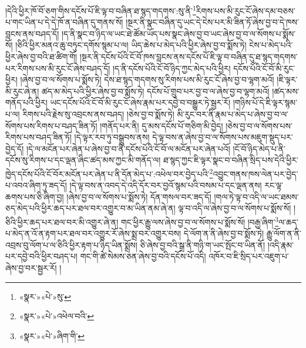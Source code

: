 །དེའི་ཕྱིར་ཁོ་བོ་ཅག་གིས་དངོས་པོ་ཇི་ལྟ་བ་བཞིན་ཐ་སྙད་གདགས་:སུ་ནི་\footnote{«སྣར་»«པེ་»སུ་}རིགས་པས་མི་རུང་ངོ་ཞེས་དམ་བཅས་པ་གང་ཡིན་པ་དེ་དེ་ཁོ་ན་བཞིན་དུ་གནས་སོ། །སྔར་ནི་སྣང་བཞིན་དུ་ཡང་དེ་ངེས་པར་མི་ཟིན་ཏོ་ཞེས་བྱ་བ་དེ་ཁས་བླངས་ནས་བཤད་དོ། །ད་ནི་སྣང་བ་ཉིད་ལ་ཡང་ཐེ་ཚོམ་ཡོད་པས་སྣང་ཞེས་བྱ་བ་ཡང་ཞེས་བྱ་བ་ལ་སོགས་པ་སྨོས་སོ། །ཅིའི་ཕྱིར་མནའ་ཆུ་བཏུང་དགོས་སྙམ་པ་ལ། ཡིད་ཆེས་པ་མེད་པའི་ཕྱིར་ཞེས་བྱ་བ་སྨོས་ཏེ། ངེས་པ་མེད་པའི་ཕྱིར་ཞེས་བྱ་བའི་ཐ་ཚིག་གོ། །སྔར་ནི་དངོས་པོའི་ངོ་བོ་ཁས་བླངས་ནས་དངོས་པོ་ཇི་ལྟ་བ་བཞིན་དུ་ཐ་སྙད་གདགས་པར་རིགས་པས་མི་རུང་ངོ་ཞེས་བཤད་དོ། །ད་ནི་དངོས་པོའི་ངོ་བོ་ཉིད་ཀྱང་མེད་པའི་ཕྱིར། དངོས་པོའི་ངོ་བོ་མི་རུང་ཕྱིར། །ཞེས་བྱ་བ་ལ་སོགས་པ་སྨོས་ཏེ། དེས་ཐ་སྙད་གདགས་སུ་རིགས་པས་མི་རུང་ངོ་ཞེས་བྱ་བ་ལྷག་མའོ། །ཇི་ལྟར་མི་རུང་ཞེ་ན། ཚད་མ་མེད་པའི་ཕྱིར་ཞེས་བྱ་བ་སྨོས་ཏེ། དངོས་པོ་གྲུབ་པར་བྱ་བ་ལ་ཞེས་བྱ་བ་ལྷག་མའོ། །ཚད་མས་གནོད་པའི་ཕྱིར། ཡང་དངོས་པོའི་ངོ་བོ་མི་རུང་ངོ་ཞེས་རྣམ་པར་དབྱེ་བ་བསྒྱུར་ཏེ་སྦྱར་རོ། །གཉིས་པོ་དེ་ཇི་ལྟར་སྙམ་པ་ལ། རིགས་པའི་རྗེས་སུ་འབྲངས་ནས་བཤད། །ཅེས་བྱ་བ་སྨོས་ཏེ། མི་རུང་བར་ནི་རྣམ་པ་མེད་པ་ཞེས་བྱ་བ་ལ་སོགས་པས་རིགས་པ་བཤད་ཟིན་ཏོ། །གནོད་པར་ནི། དུ་མས་དངོས་པོ་གཅིག་མི་བྱེད། །ཅེས་བྱ་བ་ལ་སོགས་པས་རིགས་པས་བཤད་ཟིན་ཏོ། །དེ་ལྟར་རབ་ཏུ་བསྒྲུབས་ནས། དེ་ལྟ་བས་ན་ཞེས་བྱ་བ་ལ་སོགས་པས་མཇུག་སྡུད་པར་བྱེད་དོ། །དེ་ལ་མངོན་པར་ཞེན་པ་ཞེས་བྱ་བ་ནི་དངོས་པོའི་ངོ་བོ་ལ་མངོན་པར་ཞེན་པའོ། །ངོ་བོ་ཉིད་མེད་པ་ནི་དངོས་སུ་རིགས་པ་དང་ལྡན་ཞིང་ཚད་མས་ཀྱང་མི་གནོད་ལ། ཐ་སྙད་ཀྱང་ཇི་ལྟར་སྣང་བ་བཞིན་སྲིད་པས་དེའི་ཕྱིར་ཁྱེད་དངོས་པོའི་ངོ་བོར་མངོན་པར་ཞེན་པ་ནི་དོན་མེད་པ་:འཕེལ་བར་བྱེད་པའི་\footnote{«སྣར་»«པེ་»འཕེལ་བའི་}འབྱུང་གནས་ཁས་ལེན་པར་བྱེད་པ་འབའ་ཞིག་ཏུ་ཟད་དོ། །དེ་ལྟ་བས་ན་འབད་དེ་འདི་དོར་བར་བྱའོ་སྙམ་པའི་བསམ་པ་དང་ལྡན་ནས། རང་ལྟ་ཆགས་པས་ཅི་ཞིག་བྱ། །ཞེས་བྱ་བ་ལ་སོགས་པ་སྨོས་ཏེ། དོན་གསལ་བར་ཟད་དོ། །གལ་ཏེ་ལྟ་བ་འདི་ལ་ཡང་ཐམས་ཅད་མེད་པའི་ཕྱིར་ཆད་པར་ཐལ་བར་འགྱུར་བ་མ་ཡིན་ནམ་ཞེ་ན། ལྟ་བ་འདི་ལ་ཞེས་བྱ་བ་ལ་སོགས་པ་སྨོས་སོ། །ཅིའི་ཕྱིར་ཆད་པར་ཐལ་བར་མི་འགྱུར་ཞེ་ན། གང་ཕྱིར་རྒྱུ་ལས་ཞེས་བྱ་བ་ལ་སོགས་པ་སྨོས་སོ། །བརྒྱ་ཞིག་\footnote{«སྣར་»«པེ་»ཞིག་གི་}ལ་ཆད་པ་མེད་ན་འོ་ན་རྟག་པར་ཐལ་བར་འགྱུར་རོ་ཞེས་སྨྲ་བར་འགྱུར་བས། དེ་ལོག་ན་ནི་ཞེས་བྱ་བ་སྨོས་ཏེ། རྒྱུ་ལོག་ན་ནི་འབྲས་བུ་ལོག་པ་ལ་ཅིའི་ཕྱིར་རྟག་པ་ཉིད་ཡིན་སྨྲོས། ཅི་ཞེས་བྱ་བའི་སྒྲ་ནི་གཉི་ག་ཡང་སྤོང་བ་ཡིན་ནོ། །འདི་རྣམ་པར་དབྱེ་བའི་ཕྱིར་བཤད་པ། གང་གི་ཚེ་སེམས་ཅན་ཞེས་བྱ་བའི་དངོས་པོ་འདི། འཁོར་བ་ཇི་སྲིད་པར་འཇུག་པ་ཞེས་བྱ་བར་སྦྱར་རོ། །
